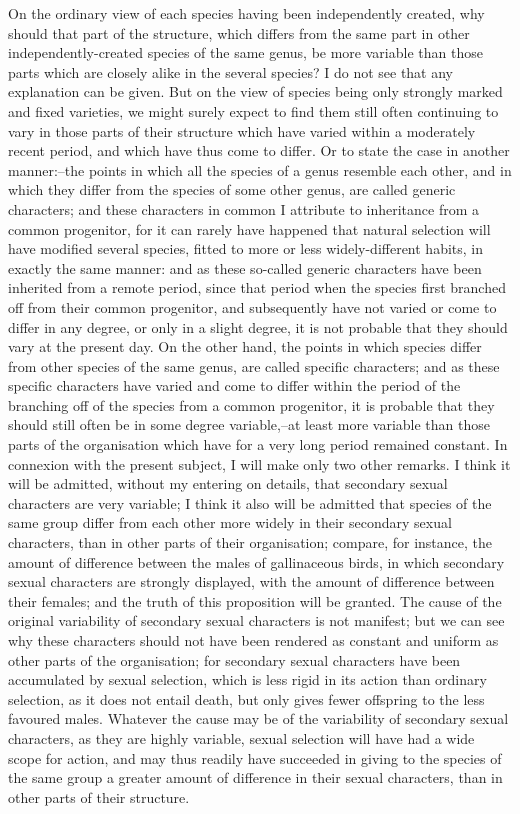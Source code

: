 On the ordinary view of each species having been independently created, why should that part of the structure, which differs from the same part in other independently-created species of the same genus, be more variable than those parts which are closely alike in the several species? I do not see that any explanation can be given. But on the view of species being only strongly marked and fixed varieties, we might surely expect to find them still often continuing to vary in those parts of their structure which have varied within a moderately recent period, and which have thus come to differ. Or to state the case in another manner:--the points in which all the species of a genus resemble each other, and in which they differ from the species of some other genus, are called generic characters; and these characters in common I attribute to inheritance from a common progenitor, for it can rarely have happened that natural selection will have modified several species, fitted to more or less widely-different habits, in exactly the same manner: and as these so-called generic characters have been inherited from a remote period, since that period when the species first branched off from their common progenitor, and subsequently have not varied or come to differ in any degree, or only in a slight degree, it is not probable that they should vary at the present day. On the other hand, the points in which species differ from other species of the same genus, are called specific characters; and as these specific characters have varied and come to differ within the period of the branching off of the species from a common progenitor, it is probable that they should still often be in some degree variable,--at least more variable than those parts of the organisation which have for a very long period remained constant.
In connexion with the present subject, I will make only two other remarks. I think it will be admitted, without my entering on details, that secondary sexual characters are very variable; I think it also will be admitted that species of the same group differ from each other more widely in their secondary sexual characters, than in other parts of their organisation; compare, for instance, the amount of difference between the males of gallinaceous birds, in which secondary sexual characters are strongly displayed, with the amount of difference between their females; and the truth of this proposition will be granted. The cause of the original variability of secondary sexual characters is not manifest; but we can see why these characters should not have been rendered as constant and uniform as other parts of the organisation; for secondary sexual characters have been accumulated by sexual selection, which is less rigid in its action than ordinary selection, as it does not entail death, but only gives fewer offspring to the less favoured males. Whatever the cause may be of the variability of secondary sexual characters, as they are highly variable, sexual selection will have had a wide scope for action, and may thus readily have succeeded in giving to the species of the same group a greater amount of difference in their sexual characters, than in other parts of their structure.
